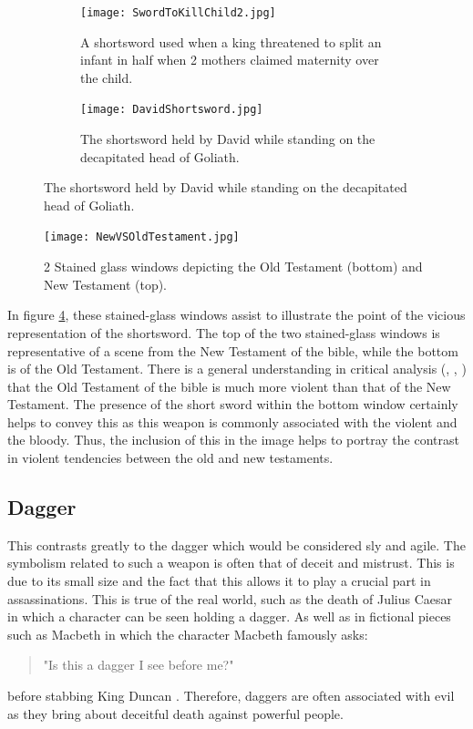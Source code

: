 \documentclass{article}
\begin{document}
\begin{figure}[h]
    \centering
    \caption{A collection of shortswords being used in brutish circumstances}
    \begin{subfigure}{0.3\textwidth}
        \texttt{[image: SwordToKillChild2.jpg]}
        \caption{A shortsword used when a king threatened to split an infant in half when 2 mothers claimed maternity over the child.}
        \label{fig:killChild}
    \end{subfigure}
    \begin{subfigure}{0.3\textwidth}
        \texttt{[image: DavidShortsword.jpg]}
        \caption{The shortsword held by David while standing on the decapitated head of Goliath.}
        \label{fig:goliathDead}
    \end{subfigure}
    \label{fig:shortswords}
\end{figure}

\begin{figure}[H]
    \centering
    \texttt{[image: NewVSOldTestament.jpg]}
    \caption{2 Stained glass windows depicting the Old Testament (bottom) and New Testament (top).}
    \label{fig:shortswordsTestament}
\end{figure}

In figure \ref{fig:shortswordsTestament}, these stained-glass windows assist to illustrate the point of the vicious representation of the shortsword. The top of the two stained-glass windows is representative of a scene from the New Testament of the bible, while the bottom is of the Old Testament. There is a general understanding in critical analysis (\parencite{fretheim2004god}, \parencite{lilly2012war}, \parencite{creach2016violence}) that the Old Testament of the bible is much more violent than that of the New Testament. The presence of the short sword within the bottom window certainly helps to convey this as this weapon is commonly associated with the violent and the bloody. Thus, the inclusion of this in the image helps to portray the contrast in violent tendencies between the old and new testaments.

\subsection{Dagger} \label{daggerSymbol}
This contrasts greatly to the dagger which would be considered sly and agile. The symbolism related to such a weapon is often that of deceit and mistrust. This is due to its small size and the fact that this allows it to play a crucial part in assassinations. This is true of the real world, such as the death of Julius Caesar \parencite{caesar} in which a character can be seen holding a dagger. As well as in fictional pieces such as Macbeth in which the character Macbeth famously asks: \begin{quote}
    "Is this a dagger I see before me?"
\end{quote}
before stabbing King Duncan \parencite{macbeth}. Therefore, daggers are often associated with evil as they bring about deceitful death against powerful people.
\end{document}
